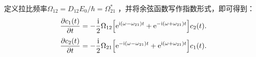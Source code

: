 \documentclass[12pt, a4paper, oneside]{ctexart}
\newcommand{\iu}{\mathrm{i}}
\begin{document}
	定义拉比频率$\Omega_{12} = D_{12}E_0/\hbar = \Omega_{21}^*$ ，并将余弦函数写作指数形式，即可得到：
	\begin{equation}
		\pdv{c_1(t)}{t}  = -\frac{\iu}{2} \Omega_{12} \qty[ \mathrm{e}^{ \iu ( \omega - \omega_{21})t }  + \mathrm{e}^{- \iu ( \omega + \omega_{21})t } ]c_2(t).
	\end{equation}
	\begin{equation}
		\pdv{c_2(t)}{t}  = -\frac{\iu}{2} \Omega_{21} \qty[ \mathrm{e}^{- \iu ( \omega - \omega_{21})t }  + \mathrm{e}^{ \iu ( \omega + \omega_{21})t } ]c_1(t).
	\end{equation}
	
	
	
\end{document}
